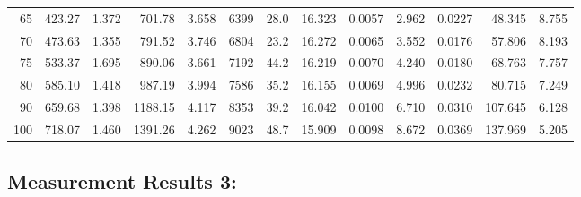 \documentclass[10pt]{article}
\begin{document}
{\begin{tabular}{|r|rr|rr|rr|rr|rr|r|r|}
       65 &       423.27 &        1.372 &       701.78 &        3.658 &         6399 &         28.0 &       16.323 &       0.0057 &        2.962 &       0.0227 &       48.345 &        8.755 \\
       70 &       473.63 &        1.355 &       791.52 &        3.746 &         6804 &         23.2 &       16.272 &       0.0065 &        3.552 &       0.0176 &       57.806 &        8.193 \\
       75 &       533.37 &        1.695 &       890.06 &        3.661 &         7192 &         44.2 &       16.219 &       0.0070 &        4.240 &       0.0180 &       68.763 &        7.757 \\
       80 &       585.10 &        1.418 &       987.19 &        3.994 &         7586 &         35.2 &       16.155 &       0.0069 &        4.996 &       0.0232 &       80.715 &        7.249 \\
       90 &       659.68 &        1.398 &      1188.15 &        4.117 &         8353 &         39.2 &       16.042 &       0.0100 &        6.710 &       0.0310 &      107.645 &        6.128 \\
      100 &       718.07 &        1.460 &      1391.26 &        4.262 &         9023 &         48.7 &       15.909 &       0.0098 &        8.672 &       0.0369 &      137.969 &        5.205 \\
\hline
\end{tabular}
}



\subsection*{\large \bf Measurement Results 3:}
\end{document}
